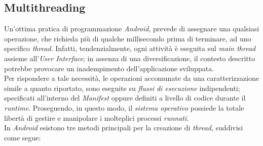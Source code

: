 \documentclass{article}
\begin{document}
\subsection*{Multithreading}
Un'ottima pratica di programmazione \textit{Android}, prevede di assegnare una qualsiasi operazione, che richieda più di qualche millisecondo prima di terminare, ad uno specifico \textit{thread}. Infatti, tendenzialmente, ogni attività è eseguita sul \textit{main thread} assieme all'\textit{User Interface}; in assenza di una diversificazione, il contesto descritto potrebbe provocare un inadempimento dell'applicazione sviluppata.\vspace*{7pt}\\
Per rispondere a tale necessità, le operazioni accomunate da una caratterizzazione simile a quanto riportato, sono eseguite su \textit{flussi di esecuzione} indipendenti; specificati all'interno del \textit{Manifest} oppure definiti a livello di codice durante il \textit{runtime}. Proseguendo, in questo modo, il \textit{sistema operativo} possiede la totale libertà di gestire e manipolare i molteplici processi \textit{runnati}.\vspace*{7pt}\\
In \textit{Android} esistono tre metodi principali per la creazione di \textit{thread}, suddivisi come segue:
\end{document}
